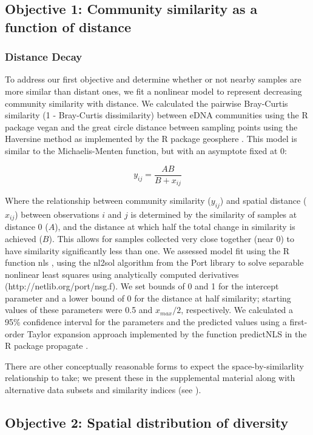 \documentclass[11pt,letterpaper]{article} %
\begin{document}
\subsection*{Objective 1: Community similarity as a function of distance}
\subsubsection*{Distance Decay}
To address our first objective and determine whether or not nearby samples are more similar than distant ones, we fit a nonlinear model to represent decreasing community similarity with distance. We calculated the pairwise Bray-Curtis similarity (1 - Bray-Curtis dissimilarity) between eDNA communities using the R package vegan \citep{vegan} and the great circle distance between sampling points using the Haversine method as implemented by the R package geosphere \citep{geosphere}. This model is similar to the Michaelis-Menten function, but with an asymptote fixed at 0:

\begin{equation}\label{MM_asy0}
	y_{ij} = \frac{AB}{B + x_{ij}}
\end{equation}


Where the relationship between community similarity ($y_{ij}$) and spatial distance ($x_{ij}$) between observations $i$ and $j$ is determined by the similarity of samples at distance 0 ($A$), and the distance at which half the total change in similarity is achieved ($B$). This allows for samples collected very close together (near 0) to have similarity significantly less than one. We assessed model fit using the R function nls \citep{R}, using the nl2sol algorithm from the Port library to solve separable nonlinear least squares using analytically computed derivatives (http://netlib.org/port/nsg.f). We set bounds of 0 and 1 for the intercept parameter and a lower bound of 0 for the distance at half similarity; starting values of these parameters were 0.5 and $x_{max}/2$, respectively. We calculated a 95\% confidence interval for the parameters and the predicted values using a first-order Taylor expansion approach implemented by the function predictNLS in the R package propagate \citep{propagate}.


There are other conceptually reasonable forms to expect the space-by-similarlity relationship to take; we present these in the supplemental material along with alternative data subsets and similarity indices (see ).

\subsection*{Objective 2: Spatial distribution of diversity}
\end{document}
